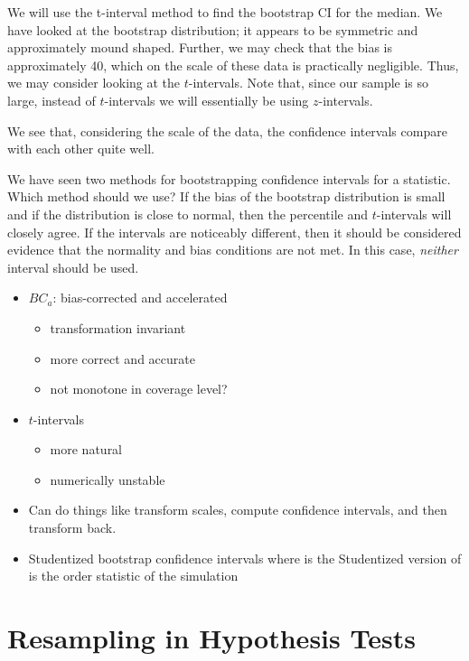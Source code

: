 \documentclass[captions=tableheading]{scrbook}
\begin{document}
\begin{example}
We will use the t-interval method to find the bootstrap CI for the median. We have looked at the bootstrap distribution; it appears to be symmetric and approximately mound shaped. Further, we may check that the bias is approximately 40, which on the scale of these data is practically negligible. Thus, we may consider looking at the \(t\)-intervals. Note that, since our sample is so large, instead of \(t\)-intervals we will essentially be using \(z\)-intervals. 
\end{example}

We see that, considering the scale of the data, the confidence intervals compare with each other quite well.

\begin{rem}
We have seen two methods for bootstrapping confidence intervals for a statistic. Which method should we use? If the bias of the bootstrap distribution is small and if the distribution is close to normal, then the percentile and \(t\)-intervals will closely agree. If the intervals are noticeably different, then it should be considered evidence that the normality and bias conditions are not met. In this case, \emph{neither} interval should be used.
\end{rem}

\begin{itemize}
\item \(BC_{a}\): bias-corrected and accelerated
\begin{itemize}
\item transformation invariant
\item more correct and accurate
\item not monotone in coverage level?
\end{itemize}
\item \(t\)-intervals
\begin{itemize}
\item more natural
\item numerically unstable
\end{itemize}
\item Can do things like transform scales, compute confidence intervals, and then transform back.
\item Studentized bootstrap confidence intervals where is the Studentized version of is the  order statistic of the simulation
\end{itemize}
\section{Resampling in Hypothesis Tests}
\label{sec-13-4}
\end{document}
